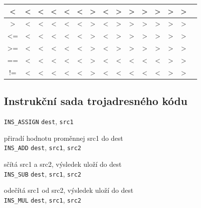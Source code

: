 \documentclass[a4paper, 12pt]{article}
\begin{document}
\begin{center}
\begin{tabular}{|c||c|c|c|c|c|c|c|c|c|c|c|c|c|c|}
\textless     & \textless & \textless & \textless & \textless & \textless & \textgreater & \textless & \textgreater        & \textgreater           & \textgreater         & \textgreater            & \textgreater & \textgreater & \\ \hline
\textgreater  & \textless & \textless & \textless & \textless & \textless & \textgreater & \textless & \textgreater        & \textgreater           & \textgreater         & \textgreater            & \textgreater & \textgreater & \\ \hline
\textless=    & \textless & \textless & \textless & \textless & \textless & \textgreater & \textless & \textgreater        & \textgreater           & \textgreater         & \textgreater            & \textgreater & \textgreater & \\ \hline
\textgreater= & \textless & \textless & \textless & \textless & \textless & \textgreater & \textless & \textgreater        & \textgreater           & \textgreater         & \textgreater            & \textgreater & \textgreater & \\ \hline
==            & \textless & \textless & \textless & \textless & \textless & \textgreater & \textless & \textless        & \textless           & \textless         & \textless            & \textgreater & \textgreater & \\ \hline
!=            & \textless & \textless & \textless & \textless & \textless & \textgreater & \textless & \textless        & \textless           & \textless         & \textless            & \textgreater & \textgreater & \\ \hline
\end{tabular}
\end{center}
\newpage

\subsection{Instrukční sada trojadresného kódu} \label{instrukce}


\texttt{INS\_ASSIGN} \texttt{dest}, \texttt{src1}

přiradí hodnotu proměnnej src1 do dest\\
\texttt{INS\_ADD} \texttt{dest}, \texttt{src1}, \texttt{src2}

sčítá src1 a src2, výsledek uloží do dest\\
\texttt{INS\_SUB} \texttt{dest}, \texttt{src1}, \texttt{src2}

odečítá src1 od src2, výsledek uloží do dest\\
\texttt{INS\_MUL} \texttt{dest}, \texttt{src1}, \texttt{src2}
\end{document}
